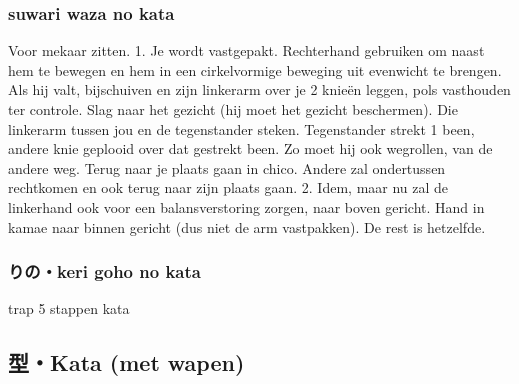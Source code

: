\subsubsection{suwari waza no kata}
Voor mekaar zitten.
1.
Je wordt vastgepakt. Rechterhand gebruiken om naast hem te bewegen en hem in een cirkelvormige beweging uit evenwicht te brengen. Als hij valt, bijschuiven en zijn linkerarm over je 2 knie\"{e}n leggen, pols vasthouden ter controle. Slag naar het gezicht (hij moet het gezicht beschermen). Die linkerarm tussen jou en de tegenstander steken. Tegenstander strekt 1 been, andere knie geplooid over dat gestrekt been. Zo moet hij ook wegrollen, van de andere weg. Terug naar je plaats gaan in chico. Andere zal ondertussen rechtkomen en ook terug naar zijn plaats gaan.
2.
Idem, maar nu zal de linkerhand ook voor een balansverstoring zorgen, naar boven gericht. Hand in kamae naar binnen gericht (dus niet de arm vastpakken). De rest is hetzelfde.

\subsubsection{りの・keri goho no kata}
trap 5 stappen kata

\subsection{型・Kata (met wapen)}

